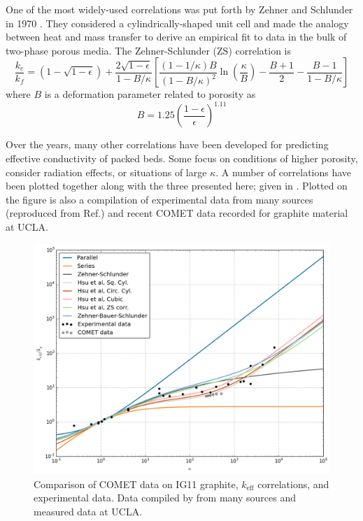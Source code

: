 \documentclass[11pt]{report} %
\begin{document}
One of the most widely-used correlations was put forth by Zehner and Schlunder in 1970 \cite{Zehner1970,Zehner1972}. They considered a cylindrically-shaped unit cell and made the analogy between heat and mass transfer to derive an empirical fit to data in the bulk of two-phase porous media. The Zehner-Schlunder (ZS) correlation is
\begin{equation}
    \frac{k_e}{k_f} = \left(1-\sqrt{1-\epsilon}\right)+\frac{2\sqrt{1-\epsilon}}{1-B/\kappa}\left[\frac{(1-1/\kappa)B}{(1-B/\kappa)^2}\ln\left( \frac{\kappa}{B} \right) - \frac{B+1}{2} - \frac{B-1}{1-B/\kappa}\right]
\end{equation}
where $B$ is a deformation parameter related to porosity as
\begin{equation}\label{eq:zs-B}
    B = 1.25\left(\frac{1-\epsilon}{\epsilon}\right)^{1.11}
\end{equation}

Over the years, many other correlations have been developed for predicting effective conductivity of packed beds. Some focus on conditions of higher porosity, consider radiation effects, or situations of large $\kappa$. A number of correlations have been plotted together along with the three presented here; given in . Plotted on the figure is also a compilation of experimental data from many sources (reproduced from Ref.\cite{VanAntwerpen2010}) and recent COMET data recorded for graphite material at UCLA.

\begin{figure}[ht]
    \centering
    \includegraphics[width=\textwidth]{images/keff-kappa-experimental-comet}
    \caption{Comparison of COMET data on IG11 graphite, $k_\text{eff}$ correlations, and experimental data. Data compiled by \cite{VanAntwerpen2010} from many sources and measured data at UCLA.}
    \label{fig:kappa-experimental-comet}
\end{figure}
\end{document}
